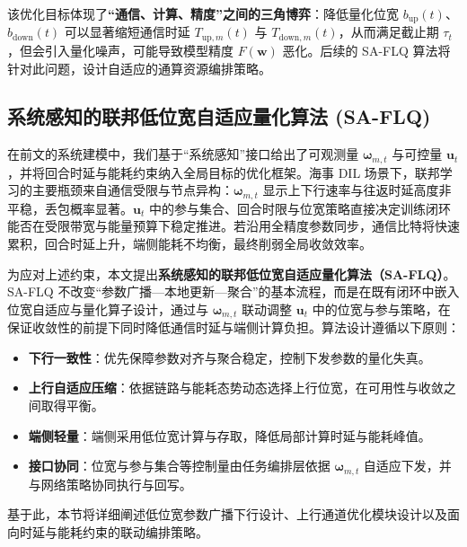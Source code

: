 该优化目标体现了\textbf{“通信、计算、精度”之间的三角博弈}：降低量化位宽 $b_{\text{up}}(t)$、$b_{\text{down}}(t)$ 可以显著缩短通信时延 $T_{\text{up},m}(t)$ 与 $T_{\text{down},m}(t)$，从而满足截止期 $\tau_t$，但会引入量化噪声，可能导致模型精度 $F(\mathbf{w})$ 恶化。后续的 SA-FLQ 算法将针对此问题，设计自适应的通算资源编排策略。

\subsection{系统感知的联邦低位宽自适应量化算法 (SA-FLQ)} \label{sec:modeling_block_ch2}
在前文的系统建模中，我们基于“系统感知”接口给出了可观测量 $\boldsymbol{\omega}_{m,t}$ 与可控量 $\mathbf{u}_t$，并将回合时延与能耗约束纳入全局目标的优化框架。海事 DIL 场景下，联邦学习的主要瓶颈来自通信受限与节点异构：$\boldsymbol{\omega}_{m,t}$ 显示上下行速率与往返时延高度非平稳，丢包概率显著。$\mathbf{u}_t$ 中的参与集合、回合时限与位宽策略直接决定训练闭环能否在受限带宽与能量预算下稳定推进。若沿用全精度参数同步，通信比特将快速累积，回合时延上升，端侧能耗不均衡，最终削弱全局收敛效率。

为应对上述约束，本文提出\textbf{系统感知的联邦低位宽自适应量化算法（SA-FLQ）}。SA-FLQ 不改变“参数广播—本地更新—聚合”的基本流程，而是在既有闭环中嵌入位宽自适应与量化算子设计，通过与 $\boldsymbol{\omega}_{m,t}$ 联动调整 $\mathbf{u}_t$ 中的位宽与参与策略，在保证收敛性的前提下同时降低通信时延与端侧计算负担。算法设计遵循以下原则：
\begin{itemize}
	\item \textbf{下行一致性}：优先保障参数对齐与聚合稳定，控制下发参数的量化失真。
	\item \textbf{上行自适应压缩}：依据链路与能耗态势动态选择上行位宽，在可用性与收敛之间取得平衡。
	\item \textbf{端侧轻量}：端侧采用低位宽计算与存取，降低局部计算时延与能耗峰值。
	\item \textbf{接口协同}：位宽与参与集合等控制量由任务编排层依据 $\boldsymbol{\omega}_{m,t}$ 自适应下发，并与网络策略协同执行与回写。
\end{itemize}

基于此，本节将详细阐述低位宽参数广播下行设计、上行通道优化模块设计以及面向时延与能耗约束的联动编排策略。


